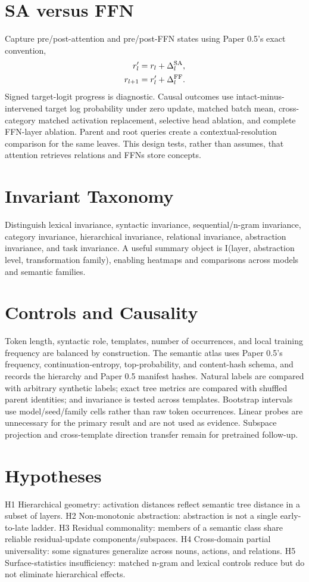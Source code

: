 \documentclass[11pt]{article}
\begin{document}
\section{SA versus FFN}
Capture pre/post-attention and pre/post-FFN states using Paper 0.5's exact convention,
\begin{align}
r'_l &= r_l+\Delta^{\rm SA}_l,\\
r_{l+1} &= r'_l+\Delta^{\rm FF}_l.
\end{align}
Signed target-logit progress is diagnostic. Causal outcomes use intact-minus-intervened target log probability under zero update, matched batch mean, cross-category matched activation replacement, selective head ablation, and complete FFN-layer ablation. Parent and root queries create a contextual-resolution comparison for the same leaves. This design tests, rather than assumes, that attention retrieves relations and FFNs store concepts.

\section{Invariant Taxonomy}
Distinguish lexical invariance, syntactic invariance, sequential/n-gram invariance, category invariance, hierarchical invariance, relational invariance, abstraction invariance, and task invariance. A useful summary object is I(layer, abstraction level, transformation family), enabling heatmaps and comparisons across models and semantic families.

\section{Controls and Causality}
Token length, syntactic role, templates, number of occurrences, and local training frequency are balanced by construction. The semantic atlas uses Paper 0.5's frequency, continuation-entropy, top-probability, and content-hash schema, and records the hierarchy and Paper 0.5 manifest hashes. Natural labels are compared with arbitrary synthetic labels; exact tree metrics are compared with shuffled parent identities; and invariance is tested across templates. Bootstrap intervals use model/seed/family cells rather than raw token occurrences. Linear probes are unnecessary for the primary result and are not used as evidence. Subspace projection and cross-template direction transfer remain for pretrained follow-up.

\section{Hypotheses}
H1 Hierarchical geometry: activation distances reflect semantic tree distance in a subset of layers. H2 Non-monotonic abstraction: abstraction is not a single early-to-late ladder. H3 Residual commonality: members of a semantic class share reliable residual-update components/subspaces. H4 Cross-domain partial universality: some signatures generalize across nouns, actions, and relations. H5 Surface-statistics insufficiency: matched n-gram and lexical controls reduce but do not eliminate hierarchical effects.
\end{document}

